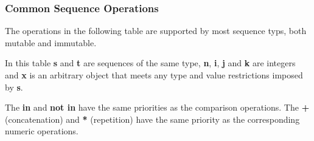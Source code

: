 \documentclass[11pt]{article}
\begin{document}
    \subsubsection{Common Sequence
Operations}\label{common-sequence-operations}

    The operations in the following table are supported by most sequence
typs, both mutable and immutable.

In this table \textbf{s} and \textbf{t} are sequences of the same type,
\textbf{n}, \textbf{i}, \textbf{j} and \textbf{k} are integers and
\textbf{x} is an arbitrary object that meets any type and value
restrictions imposed by \textbf{s}.

The \textbf{in} and \textbf{not in} have the same priorities as the
comparison operations. The \textbf{+} (concatenation) and \textbf{*}
(repetition) have the same priority as the corresponding numeric
operations.
\end{document}
